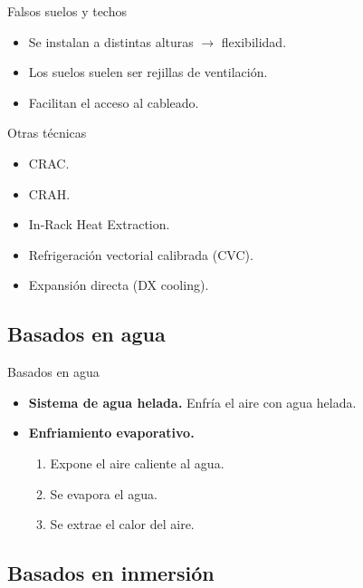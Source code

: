 \documentclass[aspectratio=169, compress]{beamer}
\begin{document}
\begin{frame}{Falsos suelos y techos}
    \begin{itemize}
        \item Se instalan a distintas alturas $\rightarrow$ flexibilidad.
        \item Los suelos suelen ser rejillas de ventilación.
        \item Facilitan el acceso al cableado.
    \end{itemize}
\end{frame}

\begin{frame}{Otras técnicas}
    \begin{itemize}
        \item CRAC.
        \item CRAH.
        \item In-Rack Heat Extraction.
        \item Refrigeración vectorial calibrada (CVC).
        \item Expansión directa (DX cooling).
    \end{itemize}
\end{frame}



\subsection{Basados en agua}

\begin{frame}{Basados en agua}
    \begin{itemize}
        \item \textbf{Sistema de agua helada.} Enfría el aire con agua helada.
        \item \textbf{Enfriamiento evaporativo.}
            \begin{enumerate}
                \item Expone el aire caliente al agua.
                \item Se evapora el agua.
                \item Se extrae el calor del aire.
            \end{enumerate}
    \end{itemize}
\end{frame}



\subsection{Basados en inmersión}
\end{document}
